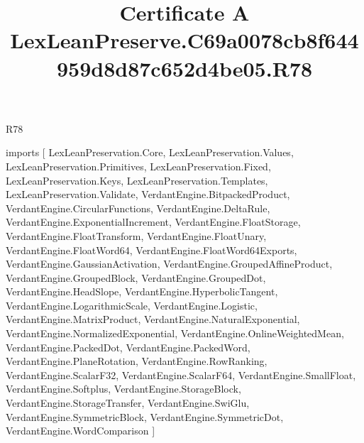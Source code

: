 \begin{lexlean}{R78}
\title{Certificate A LexLeanPreserve.C69a0078cb8f644959d8d87c652d4be05.R78}
\begin{coremodule}
imports [
  LexLeanPreservation.Core,
  LexLeanPreservation.Values,
  LexLeanPreservation.Primitives,
  LexLeanPreservation.Fixed,
  LexLeanPreservation.Keys,
  LexLeanPreservation.Templates,
  LexLeanPreservation.Validate,
  VerdantEngine.BitpackedProduct,
  VerdantEngine.CircularFunctions,
  VerdantEngine.DeltaRule,
  VerdantEngine.ExponentialIncrement,
  VerdantEngine.FloatStorage,
  VerdantEngine.FloatTransform,
  VerdantEngine.FloatUnary,
  VerdantEngine.FloatWord64,
  VerdantEngine.FloatWord64Exports,
  VerdantEngine.GaussianActivation,
  VerdantEngine.GroupedAffineProduct,
  VerdantEngine.GroupedBlock,
  VerdantEngine.GroupedDot,
  VerdantEngine.HeadSlope,
  VerdantEngine.HyperbolicTangent,
  VerdantEngine.LogarithmicScale,
  VerdantEngine.Logistic,
  VerdantEngine.MatrixProduct,
  VerdantEngine.NaturalExponential,
  VerdantEngine.NormalizedExponential,
  VerdantEngine.OnlineWeightedMean,
  VerdantEngine.PackedDot,
  VerdantEngine.PackedWord,
  VerdantEngine.PlaneRotation,
  VerdantEngine.RowRanking,
  VerdantEngine.ScalarF32,
  VerdantEngine.ScalarF64,
  VerdantEngine.SmallFloat,
  VerdantEngine.Softplus,
  VerdantEngine.StorageBlock,
  VerdantEngine.StorageTransfer,
  VerdantEngine.SwiGlu,
  VerdantEngine.SymmetricBlock,
  VerdantEngine.SymmetricDot,
  VerdantEngine.WordComparison
]


\end{coremodule}
\end{lexlean}
